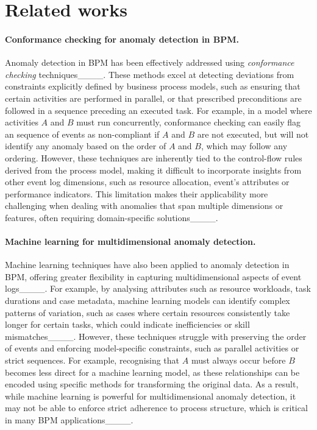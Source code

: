 \section{Related works}
\label{s:rw}
\paragraph{Conformance checking for anomaly detection in BPM.}
Anomaly detection in BPM has been effectively addressed using \textit{conformance checking} techniques____. These methods excel at detecting deviations from constraints explicitly defined by business process models, such as ensuring that certain activities are performed in parallel, or that prescribed preconditions are followed in a sequence preceding an executed task. For example, in a model where activities $A$ and $B$ must run concurrently, conformance checking can easily flag an sequence of events as non-compliant if $A$ and $B$ are not executed, but will not identify any anomaly based on the order of $A$ and $B$, which may follow any ordering. However, these techniques are inherently tied to the control-flow rules derived from the process model, making it difficult to incorporate insights from other event log dimensions, such as resource allocation, event's attributes or performance indicators. This limitation makes their applicability more challenging when dealing with anomalies that span multiple dimensions or features, often requiring domain-specific solutions____.

\paragraph{Machine learning for multidimensional anomaly detection.}
Machine learning techniques have also been applied to anomaly detection in BPM, offering greater flexibility in capturing multidimensional aspects of event logs____. For example, by analysing attributes such as resource workloads, task durations and case metadata, machine learning models can identify complex patterns of variation, such as cases where certain resources consistently take longer for certain tasks, which could indicate inefficiencies or skill mismatches____. However, these techniques struggle with preserving the order of events and enforcing model-specific constraints, such as parallel activities or strict sequences. For example, recognising that $A$ must always occur before $B$ becomes less direct for a machine learning model, as these relationships can be encoded using specific methods for transforming the original data. As a result, while machine learning is powerful for multidimensional anomaly detection, it may not be able to enforce strict adherence to process structure, which is critical in many BPM applications____.

